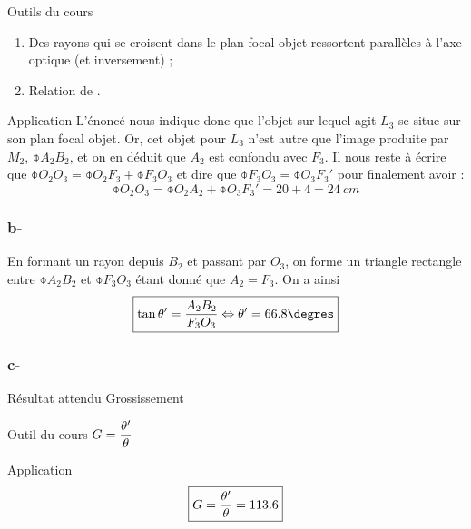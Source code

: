 \documentclass[10pt,a5paper,notitlepage]{book}
\begin{document}
\begin{NCdemo}{Outils du cours}
    \begin{enumerate}

        \item Des rayons qui se croisent dans le plan focal objet ressortent
            parallèles à l'axe optique (et inversement) ;

        \item Relation de .
    \end{enumerate}
\end{NCdemo}

\begin{NCexem}{Application}
    L'énoncé nous indique donc que l'objet sur lequel agit $L_3$ se situe sur
    son plan focal objet. Or, cet objet pour $L_3$ n'est autre que l'image
    produite par $M_2$, $\obar{A_2B_2}$, et on en déduit que $A_2$ est confondu
    avec $F_3$. Il nous reste à écrire que $\obar{O_2O_3} = \obar{O_2F_3} +
    \obar{F_3O_3}$ et dire que $\obar{F_3O_3} = \obar{O_3F_3'}$ pour finalement
    avoir :
    \[ \boxed{\obar{O_2O_3} = \obar{O_2A_2} + \obar{O_3F_3'} = 20 + 4 =
    \SI{24}{cm}} \]
\end{NCexem}

\setcounter{subsubsection}{2}
\subsubsection{b-}
En formant un rayon depuis $B_2$ et passant par $O_3$, on forme un triangle
rectangle entre $\obar{A_2B_2}$ et $ \obar{F_3O_3}$ étant donné que $A_2 = F_3$.
On a ainsi \[ \boxed{\tan\t' = \frac{A_2B_2}{F_3O_3} \Leftrightarrow \t' =
66.8\degres}\]

\setcounter{subsubsection}{2}
\subsubsection{c-}
\begin{NCprop}{Résultat attendu}
    Grossissement
\end{NCprop}

\begin{NCdemo}{Outil du cours}
    $ \displaystyle G = \frac{\theta'}{\theta}$
\end{NCdemo}

\begin{NCexem}{Application}
    \[ \boxed{G = \frac{\theta'}{\theta} = 113.6} \]
\end{NCexem}
\end{document}
